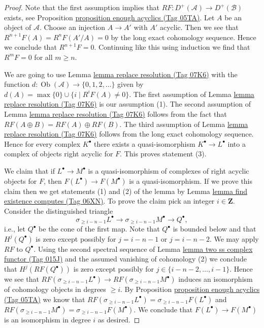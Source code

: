 \documentclass{amsart}
\theoremstyle{plain}
\theoremstyle{definition}
\theoremstyle{remark}
\numberwithin{equation}{subsection}
\def\Ob{\mathop{\mathrm{Ob}}\nolimits}
\begin{document}
\begin{proof}
Note that the first assumption implies that
$RF : D^+(\mathcal{A}) \to D^+(\mathcal{B})$ exists, see
Proposition \href{https://stacks.math.columbia.edu/tag/05TA}{proposition enough acyclics (Tag 05TA)}.
Let $A$ be an object of $\mathcal{A}$. Choose an injection $A \to A'$
with $A'$ acyclic. Then we see that $R^{n + 1}F(A) = R^nF(A'/A) = 0$ by
the long exact cohomology sequence. Hence we conclude that $R^{n + 1}F = 0$.
Continuing like this using induction we find that $R^mF = 0$ for all
$m \geq n$.

\medskip\noindent
We are going to use Lemma \href{https://stacks.math.columbia.edu/tag/07K6}{lemma replace resolution (Tag 07K6)} with the function
$d : \Ob(\mathcal{A}) \to \{0, 1, 2, \ldots \}$ given by
$d(A) = \max \{0\} \cup \{i \mid R^iF(A) \not = 0\}$.
The first assumption of Lemma \href{https://stacks.math.columbia.edu/tag/07K6}{lemma replace resolution (Tag 07K6)}
is our assumption (1). The second assumption of
Lemma \href{https://stacks.math.columbia.edu/tag/07K6}{lemma replace resolution (Tag 07K6)} follows from the fact
that $RF(A \oplus B) = RF(A) \oplus RF(B)$. The third assumption of
Lemma \href{https://stacks.math.columbia.edu/tag/07K6}{lemma replace resolution (Tag 07K6)} follows from the long exact
cohomology sequence. Hence for every complex $K^\bullet$ there exists a
quasi-isomorphism $K^\bullet \to L^\bullet$ into a complex of
objects right acyclic for $F$. This proves statement (3).

\medskip\noindent
We claim that if $L^\bullet \to M^\bullet$ is a quasi-isomorphism of
complexes of right acyclic objects for $F$, then
$F(L^\bullet) \to F(M^\bullet)$
is a quasi-isomorphism. If we prove this claim then we get statements
(1) and (2) of the lemma by
Lemma \href{https://stacks.math.columbia.edu/tag/06XN}{lemma find existence computes (Tag 06XN)}.
To prove the claim pick an integer $i \in \mathbf{Z}$.
Consider the distinguished triangle
$$
\sigma_{\geq i - n - 1}L^\bullet \to
\sigma_{\geq i - n - 1}M^\bullet \to Q^\bullet,
$$
i.e., let $Q^\bullet$ be the cone of the first map.
Note that $Q^\bullet$ is bounded below and that
$H^j(Q^\bullet)$ is zero except possibly for $j = i - n - 1$
or $j = i - n - 2$. We may apply $RF$ to $Q^\bullet$.
Using the second spectral sequence of
Lemma \href{https://stacks.math.columbia.edu/tag/015J}{lemma two ss complex functor (Tag 015J)}
and the assumed vanishing of cohomology (2) we conclude
that $H^j(RF(Q^\bullet))$ is zero except possibly for
$j \in \{i - n - 2, \ldots, i - 1\}$. Hence we see that
$RF(\sigma_{\geq i - n - 1}L^\bullet) \to RF(\sigma_{\geq i - n - 1}M^\bullet)$
induces an isomorphism of cohomology objects in degrees $\geq i$.
By Proposition \href{https://stacks.math.columbia.edu/tag/05TA}{proposition enough acyclics (Tag 05TA)} we know that
$RF(\sigma_{\geq i - n - 1}L^\bullet) = \sigma_{\geq i - n - 1}F(L^\bullet)$
and
$RF(\sigma_{\geq i - n - 1}M^\bullet) = \sigma_{\geq i - n - 1}F(M^\bullet)$.
We conclude that $F(L^\bullet) \to F(M^\bullet)$
is an isomorphism in degree $i$ as desired.


\end{proof}
\end{document}
